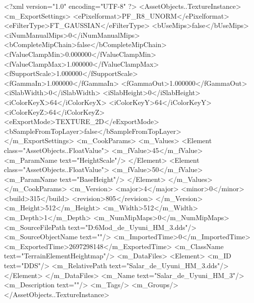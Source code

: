 <?xml version="1.0" encoding="UTF-8" ?>
<AssetObjects..TextureInstance>
	<m_ExportSettings>
		<ePixelformat>PF_R8_UNORM</ePixelformat>
		<eFilterType>FT_GAUSSIAN</eFilterType>
		<bUseMips>false</bUseMips>
		<iNumManualMips>0</iNumManualMips>
		<bCompleteMipChain>false</bCompleteMipChain>
		<fValueClampMin>0.000000</fValueClampMin>
		<fValueClampMax>1.000000</fValueClampMax>
		<fSupportScale>1.000000</fSupportScale>
		<fGammaIn>1.000000</fGammaIn>
		<fGammaOut>1.000000</fGammaOut>
		<iSlabWidth>0</iSlabWidth>
		<iSlabHeight>0</iSlabHeight>
		<iColorKeyX>64</iColorKeyX>
		<iColorKeyY>64</iColorKeyY>
		<iColorKeyZ>64</iColorKeyZ>
		<eExportMode>TEXTURE_2D</eExportMode>
		<bSampleFromTopLayer>false</bSampleFromTopLayer>
	</m_ExportSettings>
	<m_CookParams>
		<m_Values>
			<Element class="AssetObjects..FloatValue">
				<m_fValue>45</m_fValue>
				<m_ParamName text="HeightScale"/>
			</Element>
			<Element class="AssetObjects..FloatValue">
				<m_fValue>50</m_fValue>
				<m_ParamName text="BaseHeight"/>
			</Element>
		</m_Values>
	</m_CookParams>
	<m_Version>
		<major>4</major>
		<minor>0</minor>
		<build>315</build>
		<revision>805</revision>
	</m_Version>
	<m_Height>512</m_Height>
	<m_Width>512</m_Width>
	<m_Depth>1</m_Depth>
	<m_NumMipMaps>0</m_NumMipMaps>
	<m_SourceFilePath text="D:\Civ6Mod\Terrain\NW\Salar\Salar_de_Uyuni_HM_3.dds"/>
	<m_SourceObjectName text=""/>
	<m_ImportedTime>0</m_ImportedTime>
	<m_ExportedTime>2697298148</m_ExportedTime>
	<m_ClassName text="TerrainElementHeightmap"/>
	<m_DataFiles>
		<Element>
			<m_ID text="DDS"/>
			<m_RelativePath text="Salar_de_Uyuni_HM_3.dds"/>
		</Element>
	</m_DataFiles>
	<m_Name text="Salar_de_Uyuni_HM_3"/>
	<m_Description text=""/>
	<m_Tags/>
	<m_Groups/>
</AssetObjects..TextureInstance>

